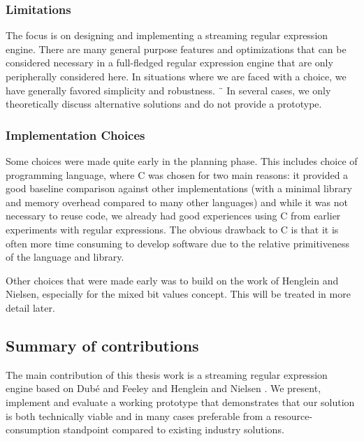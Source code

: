 \subsubsection{Limitations}

The focus is on designing and implementing a streaming regular
expression engine. There are many general purpose features and
optimizations that can be considered necessary in a full-fledged
regular expression engine that are only peripherally considered
here. In situations where we are faced with a choice, we have
generally favored simplicity and robustness.
¨
In several cases, we only theoretically discuss alternative solutions and do not provide a prototype.

\subsubsection{Implementation Choices}
Some choices were made quite early in the planning phase. This includes choice of programming language, where C was chosen for two main reasons: it provided a good baseline comparison against other implementations (with a minimal library and memory overhead compared to many other languages) and while it was not necessary to reuse code, we already had good experiences using C from earlier experiments with regular expressions. The obvious drawback to C is that it is often more time consuming to develop software due to the relative primitiveness of the language and library.

Other choices that were made early was to build on the work of Henglein and Nielsen, especially for the mixed bit values concept. This will be treated in more detail later.

\subsection{Summary of contributions}

The main contribution of this thesis work is a streaming regular
expression engine based on Dub\'{e} and Feeley \cite{Dube2000} and
Henglein and Nielsen \cite{Henglein2010}. We present, implement and
evaluate a working prototype that demonstrates that our solution is
both technically viable and in many cases preferable from a
resource-consumption standpoint compared to existing industry
solutions.

